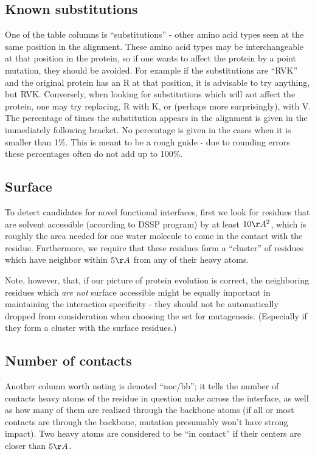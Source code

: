  \subsection{Known substitutions} One of the table columns is ``substitutions''
- other amino acid types seen at the same position in the alignment. These amino acid types may be interchangeable
at that position in the protein, so if one wants to affect the protein by a point mutation, they should be avoided.
For example if the substitutions are ``RVK'' and the  original protein has an R at that position, it is advisable to
try anything, but RVK. Conversely, when looking for substitutions which will {\emph not}  affect the protein,
one may try replacing, R with K, or (perhaps more surprisingly), with V. The percentage of times the substitution appears in the
alignment is given in the immediately following bracket. No percentage is given in the cases when it is smaller than 1\%.
This is meant to be a rough guide - due to rounding errors these percentages often do not add up to 100\%.

\subsection{Surface} To detect candidates for novel functional interfaces, first we look for residues
that are solvent accessible (according to DSSP program) by at least $10\AA^2$, 
which is roughly the area  needed for one water molecule to come in the contact with the residue.
 Furthermore, we require that these residues form a ``cluster'' of residues which have 
 neighbor within  $5\AA$ from any of their heavy atoms.

 Note, however,  that, if our picture of protein evolution is
correct, the neighboring residues which  \emph {are not} surface accessible might be equally important
in maintaining the interaction specificity - they should not be automatically dropped from consideration when
choosing the set for mutagenesis. (Especially if they form  a cluster with the surface residues.)

\subsection{Number of contacts} Another column worth noting is denoted ``noc/bb''; it tells the number of contacts heavy atoms
of the residue in question make across the interface, as well as  how many of them are realized through
the backbone atoms (if all or most contacts are through the backbone, mutation presumably won't have strong impact).
Two heavy atoms are considered to be ``in contact'' if their centers are closer than $5\AA$.

